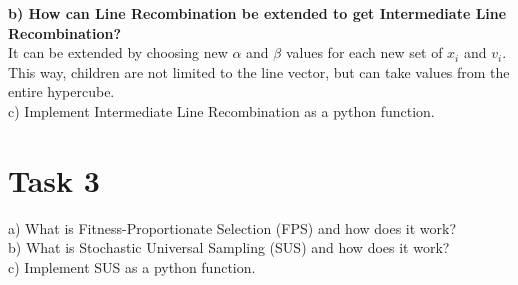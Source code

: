 \documentclass[12pt,letterpaper]{article}
\begin{document}
\textbf{b)  How can Line Recombination be extended to get Intermediate Line Recombination?} \\
It can be extended by choosing new $\alpha$ and $\beta$ values for each new set of $x_{i}$ and $v_{i}$. This way, children are not limited to the line vector, but can take values from the entire hypercube.\\

c)  Implement Intermediate Line Recombination as a python function.

\section*{Task 3}
a)  What is Fitness-Proportionate Selection (FPS) and how does it work? \\

b)  What is Stochastic Universal Sampling (SUS) and how does it work? \\

c)  Implement SUS as a python function.
\end{document}
